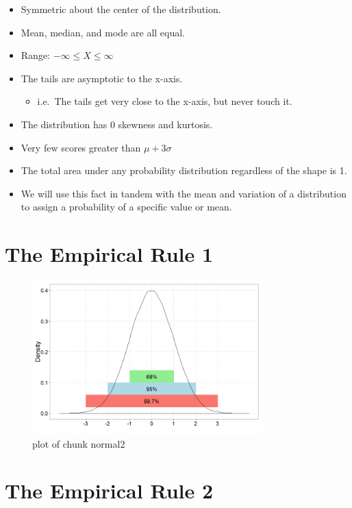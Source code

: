 \documentclass[12pt]{article}
\begin{document}
\begin{itemize}
\itemsep1pt\parskip0pt
\item
  Symmetric about the center of the distribution.
\item
  Mean, median, and mode are all equal.
\item
  Range: \(-\infty \leq X \leq \infty\)
\item
  The tails are asymptotic to the x-axis.

  \begin{itemize}
  \itemsep1pt\parskip0pt
  \item
    i.e.~The tails get very close to the x-axis, but never touch it.
  \end{itemize}
\item
  The distribution has 0 skewness and kurtosis.\\
\item
  Very few scores greater than \(\mu + 3\sigma\)
\item
  The total area under any probability distribution regardless of the
  shape is 1.\\
\item
  We will use this fact in tandem with the mean and variation of a
  distribution to assign a probability of a specific value or mean.
\end{itemize}

\section{The Empirical Rule 1}\label{the-empirical-rule-1}

\begin{figure}[H]
\centering
\includegraphics[width=3.5in]{figure/normal2-1.png}
\caption{plot of chunk normal2}
\end{figure}

\section{The Empirical Rule 2}\label{the-empirical-rule-2}
\end{document}
